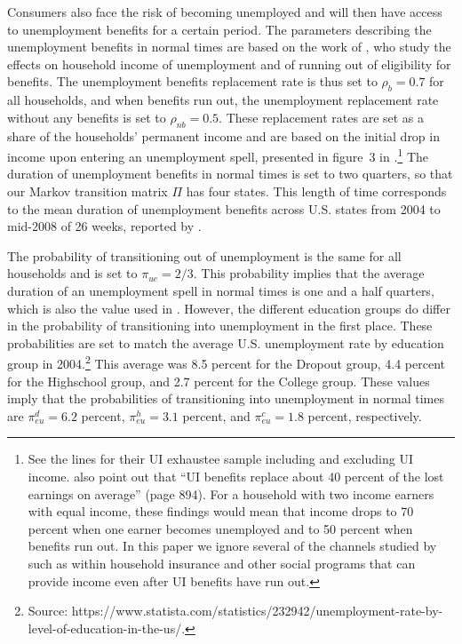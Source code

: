 \documentclass[\econtexRoot/EGMN]{subfiles}
\begin{document}
Consumers also face the risk of becoming unemployed and will then have access to unemployment benefits for a certain period. The parameters describing the unemployment benefits in normal times are based on the work of \cite{rothstein2017scraping}, who study the effects on household income of unemployment and of running out of eligibility for benefits. The unemployment benefits replacement rate is thus set to $\rho_b=0.7$ for all households, and when benefits run out, the unemployment replacement rate without any benefits is set to $\rho_{nb}=0.5$. These replacement rates are set as a share of the households' permanent income and are based on the initial drop in income upon entering an unemployment spell, presented in figure~3 in \cite{rothstein2017scraping}.\footnote{See the lines for their UI exhaustee sample including and excluding UI income. \cite{rothstein2017scraping} also point out that ``UI benefits replace about 40 percent of the lost earnings on average'' (page 894). For a household with two income earners with equal income, these findings would mean that income drops to 70 percent when one earner becomes unemployed and to 50 percent when benefits run out. In this paper we ignore several of the channels studied by \cite{rothstein2017scraping} such as within household insurance and other social programs that can provide income even after UI benefits have run out.} The duration of unemployment benefits in normal times is set to two quarters, so that our Markov transition matrix $\Pi$ has four states. This length of time corresponds to the mean duration of unemployment benefits across U.S. states from 2004 to mid-2008 of 26 weeks, reported by \cite{rothstein2017scraping}.

The probability of transitioning out of unemployment is the same for all households and is set to $\pi_{ue}=2/3$. This probability implies that the average duration of an unemployment spell in normal times is one and a half quarters, which is also the value used in \cite{carroll2020modeling}. However, the different education groups do differ in the probability of transitioning into unemployment in the first place. These probabilities are set to match the average U.S. unemployment rate by education group in 2004.\footnote{Source: https://www.statista.com/statistics/232942/unemployment-rate-by-level-of-education-in-the-us/.} This average was 8.5 percent for the Dropout group, 4.4 percent for the Highschool group, and 2.7 percent for the College group. These values imply that the probabilities of transitioning into unemployment in normal times are $\pi_{eu}^d=6.2$ percent, $\pi_{eu}^h=3.1$ percent, and $\pi_{eu}^c=1.8$ percent, respectively.
\end{document}
